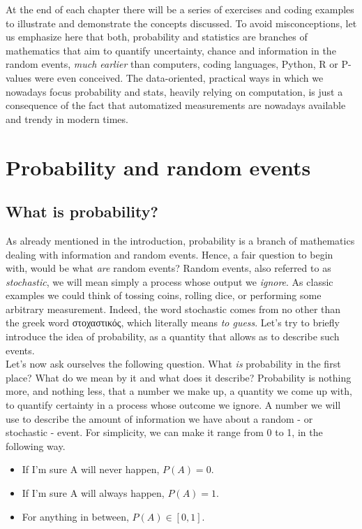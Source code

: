 \documentclass{book}
\begin{document}
At the end of each chapter there will be a series of exercises and coding examples to illustrate and demonstrate the concepts discussed. To avoid misconceptions, let us emphasize here that both, probability and statistics are branches of mathematics that aim to quantify uncertainty, chance and information in the random events, \textit{much earlier} than computers, coding languages, Python, R or P-values were even conceived. The data-oriented, practical ways in which we nowadays focus probability and stats, heavily relying on computation, is just a consequence of the fact that automatized measurements are nowadays available and trendy in modern times.\\

\chapter{Probability and random events}

\section{What is probability?}

As already mentioned in the introduction, probability is a branch of mathematics dealing with information and random events. Hence, a fair question to begin with, would be what \textit{are} random events? Random events, also referred to as \textit{stochastic}, we will mean simply a process whose output we \textit{ignore}. As classic examples we could think of tossing coins, rolling dice, or performing some arbitrary measurement. Indeed, the word stochastic comes from no other than the greek word \textgreek{στοχαστικός}, which literally means \textit{to guess}. Let's try to briefly introduce the idea of probability, as a quantity that allows as to describe such events.\\

Let's now ask ourselves the following question. What \textit{is} probability in the first place? What do we mean by it and what does it describe? Probability is nothing more, and nothing less, that a number we make up, a quantity we come up with, to quantify certainty in a process whose outcome we ignore. A number we will use to describe the amount of information we have about a random - or stochastic - event. For simplicity, we can make it range from 0 to 1, in the following way.

\begin{itemize}
\item If I'm sure A will never happen, $P(A) = 0$.
\item If I'm sure A will always happen,  $P(A) = 1$.
\item For anything in between, $P(A) \in [0, 1]$.
\end{itemize}
\end{document}
